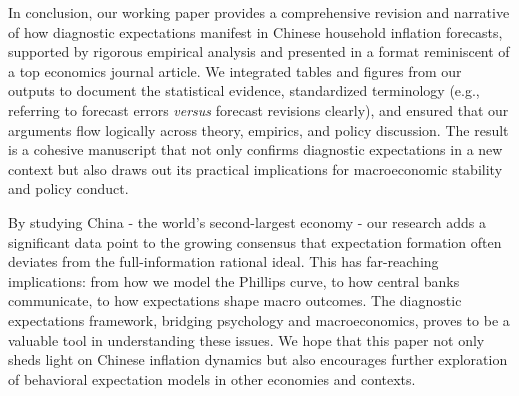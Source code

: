 \documentclass[12pt]{article}
\begin{document}
In conclusion, our working paper provides a comprehensive revision and narrative of how diagnostic expectations manifest in Chinese household inflation forecasts, supported by rigorous empirical analysis and presented in a format reminiscent of a top economics journal article. We integrated tables and figures from our outputs to document the statistical evidence, standardized terminology (e.g., referring to forecast errors \textit{versus} forecast revisions clearly), and ensured that our arguments flow logically across theory, empirics, and policy discussion. The result is a cohesive manuscript that not only confirms diagnostic expectations in a new context but also draws out its practical implications for macroeconomic stability and policy conduct.

By studying China - the world's second-largest economy - our research adds a significant data point to the growing consensus that expectation formation often deviates from the full-information rational ideal. This has far-reaching implications: from how we model the Phillips curve, to how central banks communicate, to how expectations shape macro outcomes. The diagnostic expectations framework, bridging psychology and macroeconomics, proves to be a valuable tool in understanding these issues. We hope that this paper not only sheds light on Chinese inflation dynamics but also encourages further exploration of behavioral expectation models in other economies and contexts.



\end{document}
